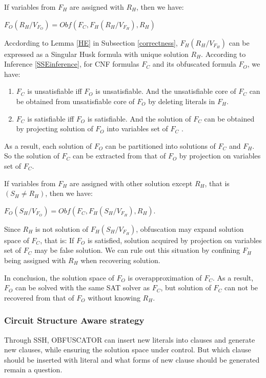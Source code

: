 \documentclass[conference]{IEEEtran}
\begin{document}
If variables from $F_H$ are assigned with $R_H$, then we have:

$F_O(R_H/V_{F_O})
=Obf(F_C,F_H(R_H/V_{F_H}),R_H)$ 

Accdording to Lemma \ref{HE} in Subsection \ref{correctness}, 
$F_H(R_H/V_{F_H})$ can be expressed as a Singular Husk formula with unique solution $R_H$.
According to Inference \ref{SSEinference}, for CNF formulas $F_C$  and its obfuscated formula $F_O$, we have:
\begin{enumerate}
 \item $F_C$  is unsatisfiable iff $F_O$ is unsatisfiable.
 And the unsatisfiable core of $F_C$  can be obtained from unsatisfiable core of $F_O$ by deleting literals in $F_H$.
 \item $F_C$  is satisfiable iff $F_O$ is satisfiable.
 And the solution of $F_C$  can be obtained by projecting solution of $F_O$ into variables set of $F_C$ .
\end{enumerate}

As a result, each solution of $F_O$ can be partitioned into solutions of $F_C$ and $F_H$. So
the solution of $F_C$ can be extracted from that of $F_O$ by projection on variables set of $F_C$.

If variables from $F_H$ are assigned with other solution except $R_H$, that is $(S_H\neq R_H)$, then we have:

$F_O(S_H/V_{F_O})
=Obf(F_C,F_H(S_H/V_{F_H}),R_H)$.

Since $R_H$ is not solution of $F_H(S_H/V_{F_H})$, obfuscation may expand solution space of $F_C$, that is:
If $F_O$ is satisfied, solution acquired by projection on variables set of $F_C$ may be false solution.
We can rule out this situation by confining $F_H$ being assigned with $R_H$ when recovering solution.

In conclusion, the solution space of $F_O$ is overapproximation of $F_C$.
As a result,
$F_O$ can be solved with the same SAT solver as $F_C$, 
but solution of $F_C$ can not be recovered from that of $F_O$ without knowing $R_H$.

\subsubsection{Circuit Structure Aware strategy}\label{embeded strategy}
Through SSH, OBFUSCATOR can insert new literals into clauses and generate new clauses, 
while ensuring the solution space under control.
But which clause should be inserted with literal and what forms of new clause should be generated remain a question.
\end{document}
